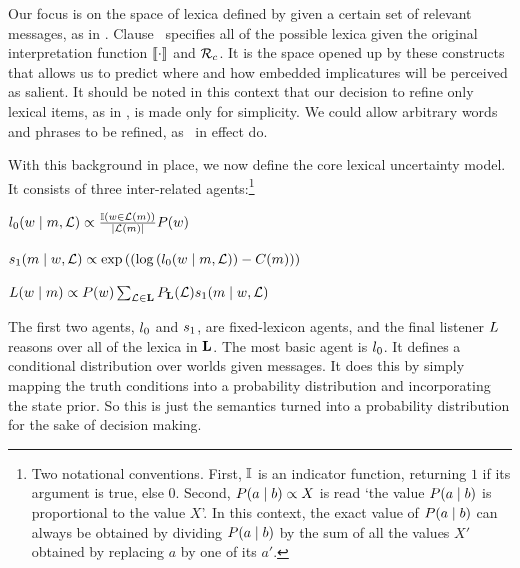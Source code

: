 \documentclass[leqno]{article}
\begin{document}
Our focus is on the space of lexica defined by
 given a certain set of relevant messages,
as in . Clause~
specifies all of the possible lexica given the original interpretation
function $\llbracket\cdot\rrbracket$ and $\mathcal{R}_{c}$. It is the space opened up by
these constructs that allows us to predict where and how embedded
implicatures will be perceived as salient. It should be noted in this
context that our decision to refine only lexical items, as in
, is made only for simplicity. We could
allow arbitrary words and phrases to be refined, as \CFS\ in effect
do.

With this background in place, we now define the core lexical
uncertainty model. It consists of three inter-related
agents:\footnote{Two notational conventions. First, $\mathbb{I}$ is an
  indicator function, returning $1$ if its argument is true, else
  $0$. Second, $P(a \mid b) \propto X$ is read `the value $P(a
  \mid b)$ is proportional to the value $X$'. In this context, the
  exact value of $P(a \mid b)$ can always be obtained by dividing
  $P(a \mid b)$ by the sum of all the values $X'$ obtained by
  replacing $a$ by one of its $a'$.}
%
\begin{examples}
\item\label{agents}
  \begin{examples}
  \item\label{l0}%
    $l_{0}(w \mid m, \mathcal{L}) \propto
    \frac{\mathbb{I}(w \in \mathcal{L}(m))}{|\mathcal{L}(m)|}
    P(w)$

  \item\label{s1}%
    $s_{1}(m \mid w, \mathcal{L}) \propto
    \exp
    \left(
      \left(
        \log\left(l_{0}(w \mid m, \mathcal{L}) \right)
        - 
        C(m)
      \right)
    \right)$
    
  \item\label{L} 
    $L(w \mid m) 
    \propto 
    P(w)
    \sum_{\mathcal{L} \in \mathbf{L}}
    P_{\mathbf{L}}(\mathcal{L})
    s_{1}(m \mid w, \mathcal{L})$
  \end{examples}
\end{examples}

The first two agents, $l_{0}$ and $s_{1}$, are
fixed-lexicon agents, and the final listener $L$
reasons over all of the lexica in $\mathbf{L}$.  The most basic agent is
$l_{0}$. It defines a conditional distribution over worlds
given messages. It does this by simply mapping the truth conditions
into a probability distribution and incorporating the state prior. So
this is just the semantics turned into a probability distribution for
the sake of decision making.
\end{document}
